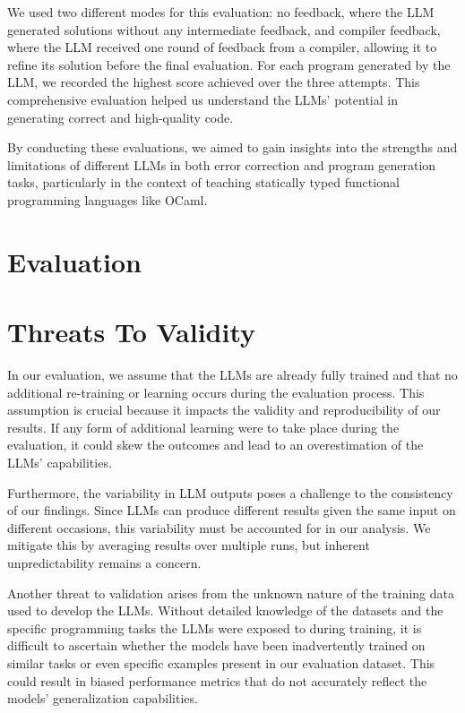 \documentclass[sigconf,authordraft]{acmart}
\begin{document}
We used two different modes for this evaluation: no feedback, where the LLM generated solutions without any intermediate feedback, and compiler feedback, where the LLM received one round of feedback from a compiler, allowing it to refine its solution before the final evaluation. For each program generated by the LLM, we recorded the highest score achieved over the three attempts. This comprehensive evaluation helped us understand the LLMs' potential in generating correct and high-quality code.

By conducting these evaluations, we aimed to gain insights into the strengths and limitations of different LLMs in both error correction and program generation tasks, particularly in the context of teaching statically typed functional programming languages like OCaml.
\section{Evaluation}

\section{Threats To Validity}
In our evaluation, we assume that the LLMs are already fully trained and that no additional re-training or learning occurs during the evaluation process. This assumption is crucial because it impacts the validity and reproducibility of our results. If any form of additional learning were to take place during the evaluation, it could skew the outcomes and lead to an overestimation of the LLMs' capabilities.

Furthermore, the variability in LLM outputs poses a challenge to the consistency of our findings. Since LLMs can produce different results given the same input on different occasions, this variability must be accounted for in our analysis. We mitigate this by averaging results over multiple runs, but inherent unpredictability remains a concern.

Another threat to validation arises from the unknown nature of the training data used to develop the LLMs. Without detailed knowledge of the datasets and the specific programming tasks the LLMs were exposed to during training, it is difficult to ascertain whether the models have been inadvertently trained on similar tasks or even specific examples present in our evaluation dataset. This could result in biased performance metrics that do not accurately reflect the models' generalization capabilities.
\end{document}
